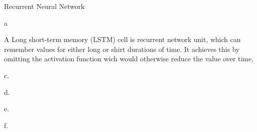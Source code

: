 \documentclass{article}
\begin{document}
\begin{enumerate}
\begin{enumerate}
		
	\end{enumerate}
	
	\begin{item}
		Recurrent Neural Network
	\end{item}
	\begin{enumerate}
		\begin{item}
			a
		\end{item}
			\begin{item}
			A Long short-term memory (LSTM) cell is recurrent network unit, which can remember values for either long or shirt durations of time. It achieves this by omitting the activation function wich would otherwise reduce the value over time,
		\end{item}
			\begin{item}
			c.
		\end{item}
			\begin{item}
			d.
		\end{item}
			\begin{item}
			e.
		\end{item}
			\begin{item}
			f.
		\end{item}
	\end{enumerate}

	
\end{enumerate}
\end{document}

